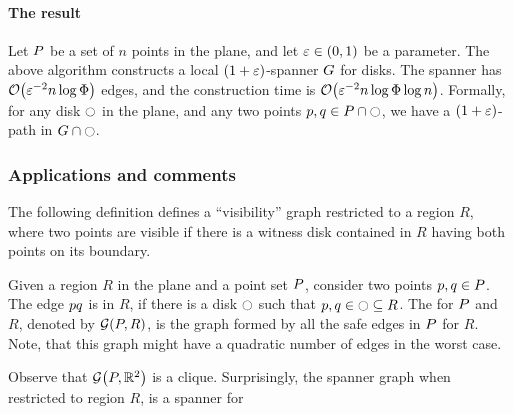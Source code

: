 \documentclass[12pt]{article}%
\begin{document}
\paragraph{The result}

\begin{theorem}
    Let $P$ be a set of $n$ points in the plane, and let
    $\varepsilon \in (0,1)$ be a parameter. The above algorithm constructs a
    local $(1+\varepsilon)$-spanner $G$ for disks. The spanner has
    $\Of\pth{ \eps^{-2} n\log \spread }$ edges, and the construction
    time is $\Of\pth{ \eps^{-2} n\log \spread \log n }$.  Formally,
    for any disk $\ocircle$ in the plane, and any two points
    $p, q \in P \cap \ocircle$, we have a $(1+\varepsilon)$-path in
    $G \cap {\ocircle}$.
\end{theorem}

\subsubsection{Applications and comments}

The following definition defines a ``visibility'' graph restricted to
a region $R$, where two points are visible if there is a witness disk
contained in $R$ having both points on its boundary.
\begin{defn}
    Given a region $R$ in the plane and a point set $P$, consider
    two points $p, q \in P$. The edge $p q$ is 
    in $R$, if there is a disk $\ocircle$ such that
    $p,q \in \ocircle \subseteq R$. The  for $P$
    and $R$, denoted by $\GY{\PS}{R}$, is the graph formed by all the
    safe edges in $P$ for $R$. Note, that this graph might have a
    quadratic number of edges in the worst case.
\end{defn}

Observe that $\GY{\PS}{\Re^2}$ is a clique. Surprisingly, the spanner
graph when restricted to region $R$, is a spanner for 
\end{document}
